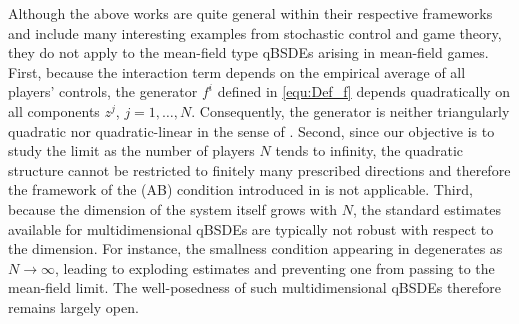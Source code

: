 \documentclass[10pt,a4paper]{article}
\theoremstyle{plain}
\theoremstyle{definition}
\numberwithin{equation}{section}
\begin{document}
Although the above works are quite general within their respective frameworks and include many interesting examples from stochastic control and game theory, they do not apply to the mean-field type qBSDEs arising in mean-field games. First, because the interaction term depends on the empirical average of all players’ controls, the generator \(f^i\) defined in \eqref{equ:Def_f} depends quadratically on all components \(z^j\), \(j=1,\dots,N\). Consequently, the generator is neither triangularly quadratic nor quadratic-linear in the sense of \cite{Jack23}. Second, since our objective is to study the limit as the number of players \(N\) tends to infinity, the quadratic structure cannot be restricted to finitely many prescribed directions and therefore the framework of the (AB) condition introduced in \cite{XZ18} is not applicable. Third, because the dimension of the system itself grows with \(N\), the standard estimates available for multidimensional qBSDEs are typically not robust with respect to the dimension. For instance, the smallness condition appearing in \cite{Tev08} degenerates as \(N \to \infty\), leading to exploding estimates and preventing one from passing to the mean-field limit. The well-posedness of such multidimensional qBSDEs therefore remains largely open.

\end{document}
